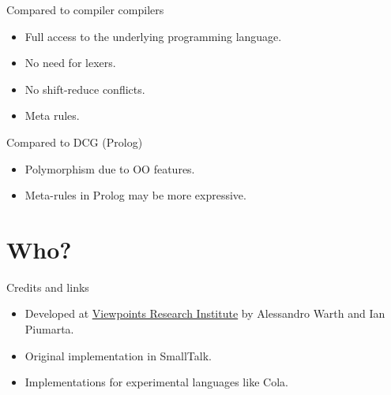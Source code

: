 \documentclass[presentation,10pt]{beamer}
\begin{document}
\begin{frame}[label=sec-2-3]{Compared to compiler compilers}
\begin{itemize}
\item Full access to the underlying programming language.
\item No need for lexers.
\item No shift-reduce conflicts.
\item Meta rules.
\end{itemize}
\end{frame}

\begin{frame}[label=sec-2-4]{Compared to DCG (Prolog)}
\begin{itemize}
\item Polymorphism due to OO features.
\item Meta-rules in Prolog may be more expressive.
\end{itemize}
\end{frame}

\section{Who?}
\label{sec-3}

\begin{frame}[label=sec-3-1]{Credits and links}
\begin{itemize}
\item Developed at \href{http://vpri.org/index.html}{Viewpoints Research Institute} by Alessandro Warth
and Ian Piumarta.
\item Original implementation in SmallTalk.
\item Implementations for experimental languages like Cola.
\end{itemize}
\end{frame}
\end{document}
